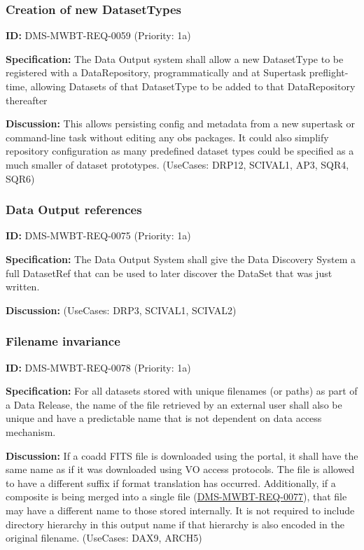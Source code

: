 \documentclass[SE,toc,lsstdraft]{lsstdoc}
\begin{document}
\subsubsection{Creation of new DatasetTypes}

\label{DMS-MWBT-REQ-0059}
\textbf{ID:} DMS-MWBT-REQ-0059 (Priority: 1a)

\textbf{Specification:}
The Data Output system shall allow a new DatasetType to be registered with a DataRepository, programmatically and at Supertask preflight-time, allowing Datasets of that DatasetType to be added to that DataRepository thereafter

\textbf{Discussion:}
This allows persisting config and metadata from a new supertask or command-line task without editing any obs packages. It could also simplify repository configuration as many predefined dataset types could be specified as a much smaller of dataset prototypes. (UseCases: DRP12, SCIVAL1, AP3, SQR4, SQR6)

\subsubsection{Data Output references}

\label{DMS-MWBT-REQ-0075}
\textbf{ID:} DMS-MWBT-REQ-0075 (Priority: 1a)

\textbf{Specification:}
The Data Output System shall give the Data Discovery System a full DatasetRef that can be used to later discover the DataSet that was just written.

\textbf{Discussion:}
(UseCases: DRP3, SCIVAL1, SCIVAL2)

\subsubsection{Filename invariance}

\label{DMS-MWBT-REQ-0078}
\textbf{ID:} DMS-MWBT-REQ-0078 (Priority: 1a)

\textbf{Specification:}
For all datasets stored with unique filenames (or paths) as part of a Data Release, the name of the file retrieved by an external user shall also be unique and have a predictable name that is not dependent on data access mechanism.

\textbf{Discussion:}
If a coadd FITS file is downloaded using the portal, it shall have the same name as if it was downloaded using VO access protocols. The file is allowed to have a different suffix if format translation has occurred. Additionally, if a composite is being merged into a single file (\hyperref[DMS-MWBT-REQ-0077]{DMS-MWBT-REQ-0077}), that file may have a different name to those stored internally. It is not required to include directory hierarchy in this output name if that hierarchy is also encoded in the original filename. (UseCases: DAX9, ARCH5)
\end{document}
